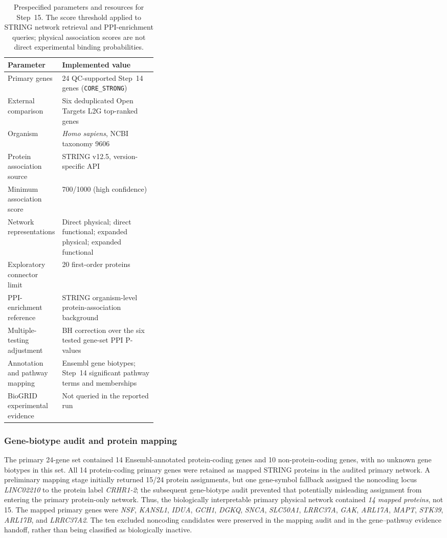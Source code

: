 \documentclass[11pt,a4paper]{article}
\begin{document}
\begin{table}[!htbp]
\centering\small
\caption{Prespecified parameters and resources for Step~15. The score threshold applied to STRING network retrieval and PPI-enrichment queries; physical association scores are not direct experimental binding probabilities.}
\label{tab:step15_settings}
\begin{tabularx}{\linewidth}{@{}p{0.34\linewidth}X@{}}
\toprule
Parameter & Implemented value \\\midrule
Primary genes & 24 QC-supported Step~14 genes (\texttt{CORE\_STRONG}) \\
External comparison & Six deduplicated Open Targets L2G top-ranked genes \\
Organism & \textit{Homo sapiens}, NCBI taxonomy 9606 \\
Protein association source & STRING v12.5, version-specific API \\
Minimum association score & 700/1000 (high confidence) \\
Network representations & Direct physical; direct functional; expanded physical; expanded functional \\
Exploratory connector limit & 20 first-order proteins \\
PPI-enrichment reference & STRING organism-level protein-association background \\
Multiple-testing adjustment & BH correction over the six tested gene-set PPI P-values \\
Annotation and pathway mapping & Ensembl gene biotypes; Step~14 significant pathway terms and memberships \\
BioGRID experimental evidence & Not queried in the reported run \\
\bottomrule
\end{tabularx}
\end{table}

\subsubsection{Gene-biotype audit and protein mapping}
The primary 24-gene set contained 14 Ensembl-annotated protein-coding genes and 10 non-protein-coding genes, with no unknown gene biotypes in this set. All 14 protein-coding primary genes were retained as mapped STRING proteins in the audited primary network. A preliminary mapping stage initially returned 15/24 protein assignments, but one gene-symbol fallback assigned the noncoding locus \textit{LINC02210} to the protein label \textit{CRHR1-2}; the subsequent gene-biotype audit prevented that potentially misleading assignment from entering the primary protein-only network. Thus, the biologically interpretable primary physical network contained \emph{14 mapped proteins}, not 15. The mapped primary genes were \textit{NSF}, \textit{KANSL1}, \textit{IDUA}, \textit{GCH1}, \textit{DGKQ}, \textit{SNCA}, \textit{SLC50A1}, \textit{LRRC37A}, \textit{GAK}, \textit{ARL17A}, \textit{MAPT}, \textit{STK39}, \textit{ARL17B}, and \textit{LRRC37A2}. The ten excluded noncoding candidates were preserved in the mapping audit and in the gene--pathway evidence handoff, rather than being classified as biologically inactive.
\end{document}
